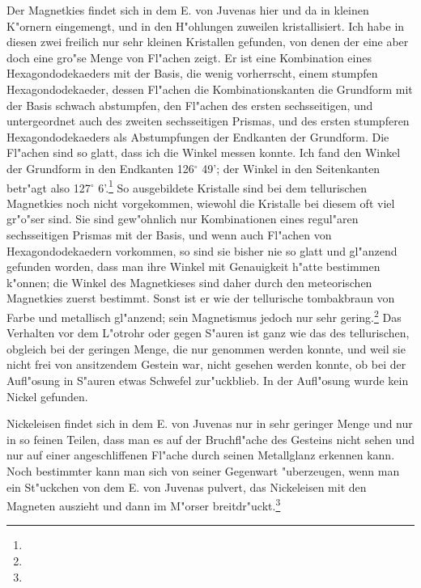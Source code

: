 \documentclass[a4paper, 11pt, oneside]{article}
\begin{document}
Der Magnetkies findet sich in dem E. von Juvenas hier und da in kleinen K"ornern eingemengt, und in den H"ohlungen zuweilen kristallisiert. Ich habe in diesen zwei freilich nur sehr kleinen Kristallen gefunden, von denen der eine aber doch eine gro"se Menge von Fl"achen zeigt. Er ist eine Kombination eines Hexagondodekaeders mit der Basis, die wenig vorherrscht, einem stumpfen Hexagondodekaeder, dessen Fl"achen die Kombinationskanten die Grundform mit der Basis schwach abstumpfen, den Fl"achen des ersten sechsseitigen, und untergeordnet auch des zweiten sechsseitigen Prismas, und des ersten stumpferen Hexagondodekaeders als Abstumpfungen der Endkanten der Grundform. Die Fl"achen sind so glatt, dass ich die Winkel messen konnte. Ich fand den Winkel der Grundform in den Endkanten 126$^{\circ}$ 49’; der Winkel in den Seitenkanten betr"agt also 127$^{\circ}$ 6’.\footnote{} So ausgebildete Kristalle sind bei dem tellurischen Magnetkies noch nicht vorgekommen, wiewohl die Kristalle bei diesem oft viel gr"o"ser sind. Sie sind gew"ohnlich nur Kombinationen eines regul"aren sechsseitigen Prismas mit der Basis, und wenn auch Fl"achen von Hexagondodekaedern vorkommen, so sind sie bisher nie so glatt und gl"anzend gefunden worden, dass man ihre Winkel mit Genauigkeit h"atte bestimmen k"onnen; die Winkel des Magnetkieses sind daher durch den meteorischen Magnetkies zuerst bestimmt. Sonst ist er wie der tellurische tombakbraun von Farbe und metallisch gl"anzend; sein Magnetismus jedoch nur sehr gering.\footnote{} Das Verhalten vor dem L"otrohr oder gegen S"auren ist ganz wie das des tellurischen, obgleich bei der geringen Menge, die nur genommen werden konnte, und weil sie nicht frei von ansitzendem Gestein war, nicht gesehen werden konnte, ob bei der Aufl"osung in S"auren etwas Schwefel zur"uckblieb. In der Aufl"osung wurde kein Nickel gefunden.

Nickeleisen findet sich in dem E. von Juvenas nur in sehr geringer Menge und nur in so feinen Teilen, dass man es auf der Bruchfl"ache des Gesteins nicht sehen und nur auf einer angeschliffenen Fl"ache durch seinen Metallglanz erkennen kann. Noch bestimmter kann man sich von seiner Gegenwart "uberzeugen, wenn man ein St"uckchen von dem E. von Juvenas pulvert, das Nickeleisen mit den Magneten auszieht und dann im M"orser breitdr"uckt.\footnote{}
\end{document}
